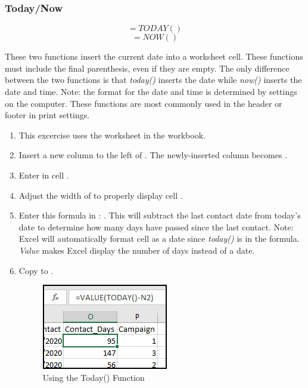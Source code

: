 \subsubsection{Today/Now}

\[ =TODAY() \]
\[ =NOW() \]

These two functions insert the current date into a worksheet cell. These functions must include the final parenthesis, even if they are empty. The only difference between the two functions is that \textit{today()} inserts the date while \textit{now()} inserts the date and time. Note: the format for the date and time is determined by settings on the computer. These functions are most commonly used in the header or footer in print settings.

\begin{enumerate}
	\item This excercise uses the  worksheet in the  workbook.
	\item Insert a new column to the left of . The newly-inserted column becomes .
	\item Enter  in cell .
	\item Adjust the width of  to properly display cell .
	\item Enter this formula in : . This will subtract the last contact date from today's date to determine how many days have passed since the last contact. Note: Excel will automatically format cell  as a date since \textit{today()} is in the formula. \textit{Value} makes Excel display the number of days instead of a date.
	\item Copy  to .
	
	\begin{figure}[H]
		\centering
		\includegraphics[width=\maxwidth{.95\linewidth}]{gfx/ch09_fig45}
		\caption{Using the Today() Function}
		\label{09:fig45}
	\end{figure}
	
\end{enumerate}

